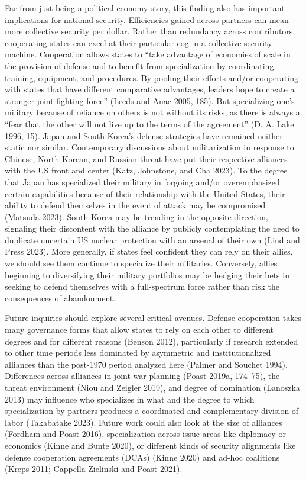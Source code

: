 \documentclass[
  12,
  letterpaper,
  DIV=11,
  numbers=noendperiod]{scrartcl}
\begin{document}
Far from just being a political economy story, this finding also has
important implications for national security. Efficiencies gained across
partners can mean more collective security per dollar. Rather than
redundancy across contributors, cooperating states can excel at their
particular cog in a collective security machine. Cooperation allows
states to ``take advantage of economies of scale in the provision of
defense and to benefit from specialization by coordinating training,
equipment, and procedures. By pooling their efforts and/or cooperating
with states that have different comparative advantages, leaders hope to
create a stronger joint fighting force'' (Leeds and Anac 2005, 185). But
specializing one's military because of reliance on others is not without
its risks, as there is always a ``fear that the other will not live up
to the terms of the agreement'' (D. A. Lake 1996, 15). Japan and South
Korea's defense strategies have remained neither static nor similar.
Contemporary discussions about militarization in response to Chinese,
North Korean, and Russian threat have put their respective alliances
with the US front and center (Katz, Johnstone, and Cha 2023). To the
degree that Japan has specialized their military in forgoing and/or
overemphasized certain capabilities because of their relationship with
the United States, their ability to defend themselves in the event of
attack may be compromised (Matsuda 2023). South Korea may be trending in
the opposite direction, signaling their discontent with the alliance by
publicly contemplating the need to duplicate uncertain US nuclear
protection with an arsenal of their own (Lind and Press 2023). More
generally, if states feel confident they can rely on their allies, we
should see them continue to specialize their militaries. Conversely,
allies beginning to diversifying their military portfolios may be
hedging their bets in seeking to defend themselves with a full-spectrum
force rather than risk the consequences of abandonment.

Future inquiries should explore several critical avenues. Defense
cooperation takes many governance forms that allow states to rely on
each other to different degrees and for different reasons (Benson 2012),
particularly if research extended to other time periods less dominated
by asymmetric and institutionalized alliances than the post-1970 period
analyzed here (Palmer and Souchet 1994). Differences across alliances in
joint war planning (Poast 2019a, 174--75), the threat environment (Niou
and Zeigler 2019), and degree of domination (Lanoszka 2013) may
influence who specializes in what and the degree to which specialization
by partners produces a coordinated and complementary division of labor
(Takabatake 2023). Future work could also look at the size of alliances
(Fordham and Poast 2016), specialization across issue areas like
diplomacy or economics (Kinne and Bunte 2020), or different kinds of
security alignments like defense cooperation agreements (DCAs) (Kinne
2020) and ad-hoc coalitions (Kreps 2011; Cappella Zielinski and Poast
2021).
\end{document}
